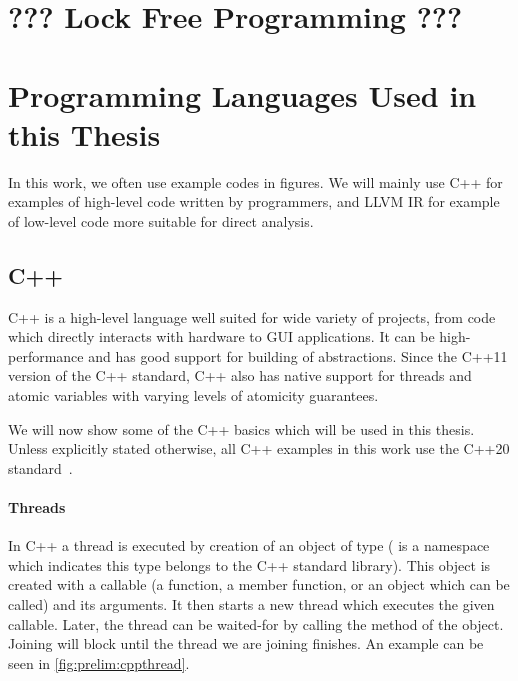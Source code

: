 \section{??? Lock Free Programming ???}

\section{Programming Languages Used in this Thesis}

In this work, we often use example codes in figures.
We will mainly use C++ for examples of high-level code written by programmers,
and LLVM IR for example of low-level code more suitable for direct analysis.

\subsection{C++}

C++ is a high-level language well suited for wide variety of projects, from
code which directly interacts with hardware to GUI applications.
It can be high-performance and has good support for building of abstractions.
Since the C++11 version of the C++ standard, C++ also has native support for
threads and atomic variables with varying levels of atomicity guarantees.

We will now show some of the C++ basics which will be used in this thesis.
Unless explicitly stated otherwise, all C++ examples in this work use the C++20
standard~\cite{cpp20}.

\paragraph{Threads}

In C++ a thread is executed by creation of an object of type 
( is a namespace which indicates this type belongs to the C++
standard library).
This object is created with a callable (a function, a member function, or an
object which can be called) and its arguments.
It then starts a new thread which executes the given callable.
Later, the thread can be waited-for by calling the  method of the
 object.
Joining will block until the thread we are joining finishes.
An example can be seen in \autoref{fig:prelim:cppthread}.

